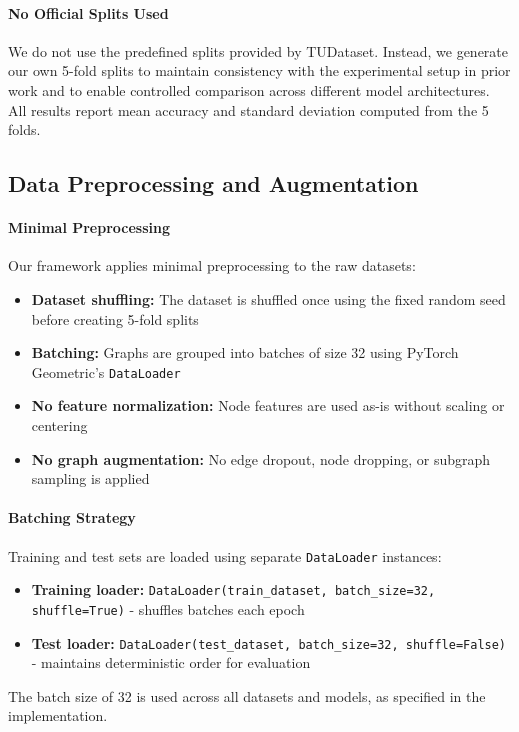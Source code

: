\paragraph{No Official Splits Used}
We do not use the predefined splits provided by TUDataset. Instead, we generate our own 5-fold splits to maintain consistency with the experimental setup in prior work and to enable controlled comparison across different model architectures. All results report mean accuracy and standard deviation computed from the 5 folds.

\subsection{Data Preprocessing and Augmentation}

\paragraph{Minimal Preprocessing}
Our framework applies minimal preprocessing to the raw datasets:
\begin{itemize}
    \item \textbf{Dataset shuffling:} The dataset is shuffled once using the fixed random seed before creating 5-fold splits
    \item \textbf{Batching:} Graphs are grouped into batches of size 32 using PyTorch Geometric's \texttt{DataLoader}
    \item \textbf{No feature normalization:} Node features are used as-is without scaling or centering
    \item \textbf{No graph augmentation:} No edge dropout, node dropping, or subgraph sampling is applied
\end{itemize}

\paragraph{Batching Strategy}
Training and test sets are loaded using separate \texttt{DataLoader} instances:
\begin{itemize}
    \item \textbf{Training loader:} \texttt{DataLoader(train\_dataset, batch\_size=32, shuffle=True)} - shuffles batches each epoch
    \item \textbf{Test loader:} \texttt{DataLoader(test\_dataset, batch\_size=32, shuffle=False)} - maintains deterministic order for evaluation
\end{itemize}
The batch size of 32 is used across all datasets and models, as specified in the implementation.

